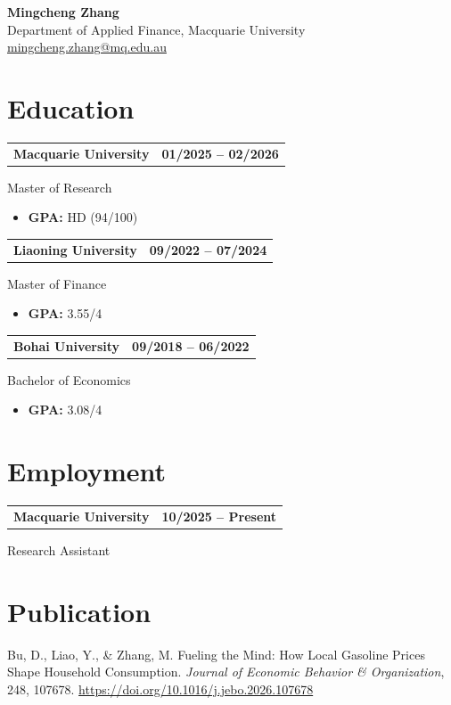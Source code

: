 \documentclass[11pt, a4paper]{article}
\makeatletter
\newcommand{\cventry}[4]{%
  \begin{tabularx}{\linewidth}{@{}X r@{}}
    \textbf{#1} & \textbf{#2}
  \end{tabularx}
  \vspace{1pt}
  #3
  \vspace{2pt}
  #4
  \vspace{6pt}
}
\makeatother
\begin{document}
\begin{center}
  {\LARGE \textbf{Mingcheng Zhang}} \\[6pt]
  Department of Applied Finance, Macquarie University \\[3pt]
  \href{mailto:mingcheng.zhang@mq.edu.au}{mingcheng.zhang@mq.edu.au}
\end{center}

\vspace{4pt}

\section{Education}

\cventry{Macquarie University}{01/2025 -- 02/2026}{%
  Master of Research
}{%
  \begin{itemize}[leftmargin=1.5em, itemsep=1pt, topsep=1pt]
    \item \textbf{GPA:} HD (94/100)
  \end{itemize}
}

\cventry{Liaoning University}{09/2022 -- 07/2024}{%
  Master of Finance
}{%
  \begin{itemize}[leftmargin=1.5em, itemsep=1pt, topsep=1pt]
    \item \textbf{GPA:} 3.55/4
  \end{itemize}
}

\cventry{Bohai University}{09/2018 -- 06/2022}{%
  Bachelor of Economics
}{%
  \begin{itemize}[leftmargin=1.5em, itemsep=1pt, topsep=1pt]
    \item \textbf{GPA:} 3.08/4
  \end{itemize}
}

\section{Employment}

\cventry{Macquarie University}{10/2025 -- Present}{%
  Research Assistant
}{}

\section{Publication}

Bu, D., Liao, Y., \& Zhang, M. Fueling the Mind: How Local Gasoline Prices Shape
Household Consumption. \textit{Journal of Economic Behavior \& Organization}, 248, 107678.
\href{https://doi.org/10.1016/j.jebo.2026.107678}{https://doi.org/10.1016/j.jebo.2026.107678}
\end{document}
